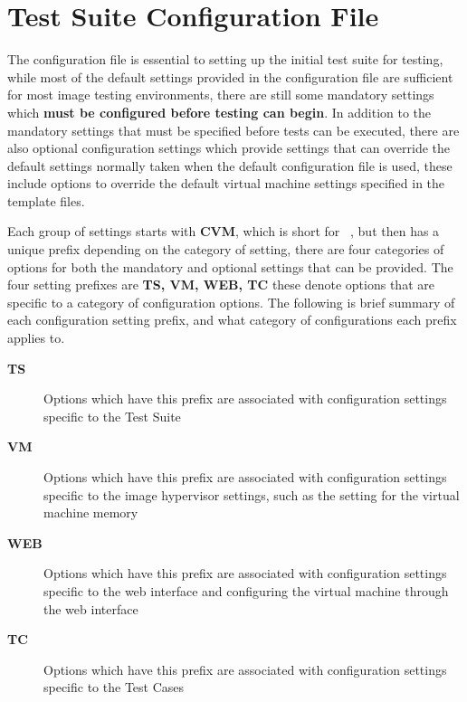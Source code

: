 \chapter{Test Suite Configuration File}
\label{sct:configfile}

The configuration file is essential to setting up the initial \cernvm test suite for testing, while most of the default 
settings provided in the configuration file are sufficient for most \cernvm image testing environments, there are still
some mandatory settings which {\bf must be configured before testing can begin}. In addition to the mandatory settings
that must be specified before tests can be executed, there are also optional configuration settings which provide settings
that can override the default settings normally taken when the default configuration file is used, these include options
to override the default virtual machine settings specified in the template files.

Each group of settings starts with {\bf CVM}, which is short for \cernvm~, but then has a unique prefix depending on the 
category of setting, there are four categories of options for both the mandatory and optional settings that can be provided. 
The four setting prefixes are {\bf TS, VM, WEB, TC} these denote options that are specific to a category of configuration options. 
The following is brief summary of each configuration setting prefix, and what category of configurations each prefix applies to.

\begin{description}
\item[{\bf TS}]		Options which have this prefix are associated with configuration settings specific to the
					\cernvmreleasetesting Test Suite

\item[{\bf VM}]		Options which have this prefix are associated with configuration settings specific to the
					\cernvm image hypervisor settings, such as the setting for the virtual machine memory
					
\item[{\bf WEB}]	Options which have this prefix are associated with configuration settings specific to the
					\cernvm web interface and configuring the virtual machine through the web interface
					
\item[{\bf TC}]		Options which have this prefix are associated with configuration settings specific to the
					\cernvm Test Cases
\end{description}


